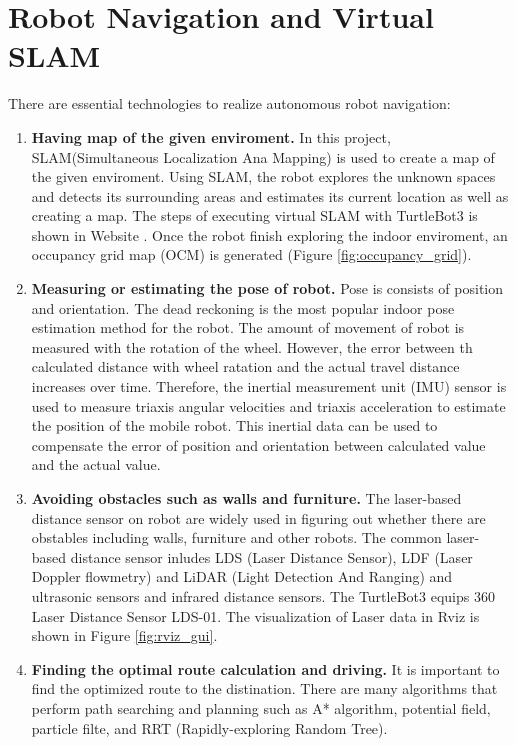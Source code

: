 \section{Robot Navigation and Virtual SLAM}
\label{sec:navigation}

There are essential technologies to realize autonomous robot navigation: 
\begin{enumerate}
    \item \textbf{Having map of the given enviroment.} In this project, SLAM(Simultaneous Localization Ana Mapping) is used to create a map of the given enviroment. Using SLAM, the robot explores the unknown spaces and detects its surrounding areas and estimates its current location as well as creating a map. The steps of executing virtual SLAM with TurtleBot3 is shown in Website \cite{T3SLAM}. Once the robot finish exploring the indoor enviroment, an occupancy grid map (OCM) is generated (Figure \ref{fig:occupancy_grid}).
    \item \textbf{Measuring or estimating the pose of robot.} Pose is consists of position and orientation. The dead reckoning \cite{DEADRECKONING} is the most popular indoor pose estimation method for the robot. The amount of movement of robot is measured with the rotation of the wheel. However, the error between th calculated distance with wheel ratation and the actual travel distance increases over time. Therefore, the inertial measurement unit (IMU) sensor\cite{Woojin17} is used to measure triaxis angular velocities and triaxis acceleration to estimate the position of the mobile robot.  This inertial data can be used to compensate the error of position and orientation between calculated value and the actual value.
    \item \textbf{Avoiding obstacles such as walls and furniture.} The laser-based distance sensor on robot are widely used in figuring out whether there are obstables including walls, furniture and other robots. The common laser-based distance sensor inludes LDS (Laser Distance Sensor), LDF (Laser Doppler flowmetry) and LiDAR (Light Detection And Ranging) and ultrasonic sensors and infrared distance sensors. The TurtleBot3 equips 360 Laser Distance Sensor LDS-01. The visualization of Laser data in Rviz is shown in Figure \ref{fig:rviz_gui}.
    \item \textbf{Finding the optimal route calculation and driving.} It is important to find the optimized route to the distination. There are many algorithms that perform path searching and planning such as A* algorithm\cite{ASEARCH}, potential field\cite{POTENTIAL}, particle filte\cite{PARTICLE}, and RRT (Rapidly-exploring Random Tree)\cite{RRT}.

\end{enumerate}
